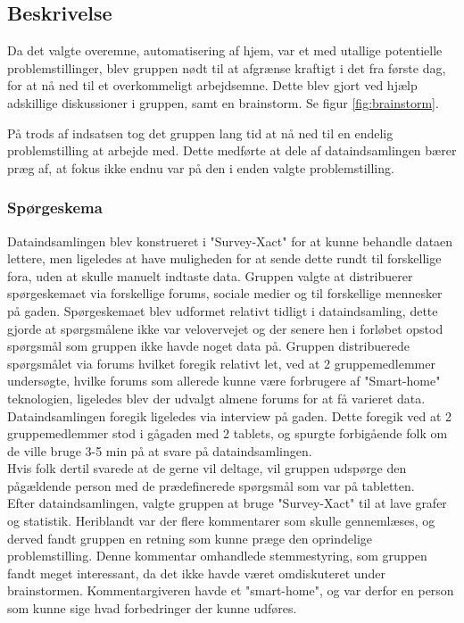 \subsection{Beskrivelse} %
Da det valgte overemne, automatisering af hjem, var et med utallige potentielle problemstillinger, blev gruppen nødt til at afgrænse kraftigt i det fra første dag, for at nå ned til et overkommeligt arbejdsemne. Dette blev gjort ved hjælp adskillige diskussioner i gruppen, samt en brainstorm. Se figur \ref{fig:brainstorm}.

På trods af indsatsen tog det gruppen lang tid at nå ned til en endelig problemstilling at arbejde med. Dette medførte at dele af dataindsamlingen bærer præg af, at fokus ikke endnu var på den i enden valgte problemstilling.\\

\subsubsection{Spørgeskema}
Dataindsamlingen blev konstrueret i "Survey-Xact" for at kunne behandle dataen lettere, men ligeledes at have muligheden for at sende dette rundt til forskellige fora, uden at skulle manuelt indtaste data.
Gruppen valgte at distribuerer spørgeskemaet via forskellige forums, sociale medier og til forskellige mennesker på gaden. Spørgeskemaet blev udformet relativt tidligt i dataindsamling, dette gjorde at spørgsmålene ikke var velovervejet og der senere hen i forløbet opstod spørgsmål som gruppen ikke havde noget data på. Gruppen distribuerede spørgsmålet via forums hvilket foregik relativt let, ved at 2 gruppemedlemmer undersøgte, hvilke forums som allerede kunne være forbrugere af "Smart-home" teknologien, ligeledes blev der udvalgt almene forums for at få varieret data.\\

Dataindsamlingen foregik ligeledes via interview på gaden. Dette foregik ved at 2 gruppemedlemmer stod i gågaden med 2 tablets, og spurgte forbigående folk om de ville bruge 3-5 min på at svare på dataindsamlingen.\\

Hvis folk dertil svarede at de gerne vil deltage, vil gruppen udspørge den pågældende person med de prædefinerede spørgsmål som var på tabletten.\\

Efter dataindsamlingen, valgte gruppen at bruge "Survey-Xact" til at lave grafer og statistik. Heriblandt var der flere kommentarer som skulle gennemlæses, og derved fandt gruppen en retning som kunne præge den oprindelige problemstilling. Denne kommentar omhandlede stemmestyring, som gruppen fandt meget interessant, da det ikke havde været omdiskuteret under brainstormen. Kommentargiveren havde et "smart-home", og var derfor en person som kunne sige hvad forbedringer der kunne udføres.\\ 

